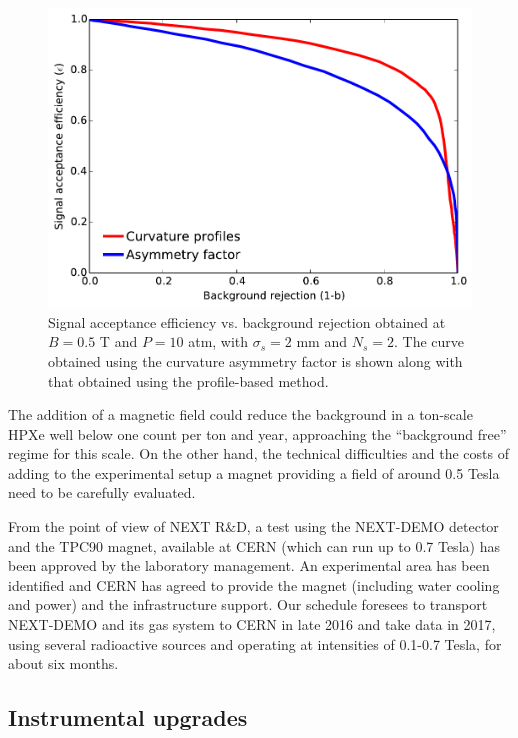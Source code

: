 \begin{figure}[!htb]
	\centering
	\includegraphics[scale=0.55]{img2/sigvsb_prof_vs_asymm.pdf}
	\caption{\label{fig_svsbprof}Signal acceptance efficiency vs. background rejection obtained at $B = 0.5$ T and $P = 10$ atm, with $\sigma_{s} = 2$ mm and $N_{s} = 2$.  The curve obtained using the curvature asymmetry factor is shown along with that obtained using the profile-based method.}
\end{figure}

The addition of a magnetic field could reduce the background in a ton-scale HPXe well below one count per ton and year, approaching the ``background free'' regime for this scale. On the other hand, the technical difficulties and the costs of adding to the experimental setup a magnet providing a field of around 0.5 Tesla need to be carefully evaluated. 

From the point of view of NEXT R\&D, a test using the NEXT-DEMO detector and the TPC90 magnet, available at CERN (which can run up to 0.7 Tesla) has been approved by the laboratory management. An experimental area has been identified and CERN has agreed to provide the magnet (including water cooling and power) and the infrastructure support. Our schedule foresees to transport NEXT-DEMO and its gas system to CERN in late 2016 and take data in 2017, using several radioactive sources and operating at intensities of 0.1-0.7 Tesla, for about six months.

\subsection{Instrumental upgrades}

